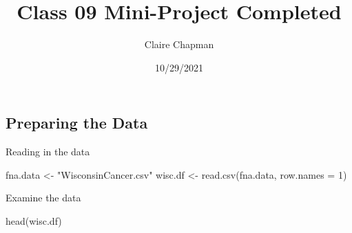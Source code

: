 \documentclass[
]{article}
\title{Class 09 Mini-Project Completed}
\author{Claire Chapman}
\date{10/29/2021}
\newenvironment{Shaded}{\begin{snugshade}}{\end{snugshade}}
\newcommand{\AttributeTok}[1]{\textcolor[rgb]{0.77,0.63,0.00}{#1}}
\newcommand{\DecValTok}[1]{\textcolor[rgb]{0.00,0.00,0.81}{#1}}
\newcommand{\FunctionTok}[1]{\textcolor[rgb]{0.00,0.00,0.00}{#1}}
\newcommand{\NormalTok}[1]{#1}
\newcommand{\OtherTok}[1]{\textcolor[rgb]{0.56,0.35,0.01}{#1}}
\newcommand{\StringTok}[1]{\textcolor[rgb]{0.31,0.60,0.02}{#1}}
\begin{document}
\maketitle

\hypertarget{preparing-the-data}{%
\subsection{Preparing the Data}\label{preparing-the-data}}

Reading in the data

\begin{Shaded}
\begin{Highlighting}[]
\NormalTok{fna.data }\OtherTok{\textless{}{-}} \StringTok{"WisconsinCancer.csv"}
\NormalTok{wisc.df }\OtherTok{\textless{}{-}} \FunctionTok{read.csv}\NormalTok{(fna.data, }\AttributeTok{row.names =} \DecValTok{1}\NormalTok{)}
\end{Highlighting}
\end{Shaded}

Examine the data

\begin{Shaded}
\begin{Highlighting}[]
\FunctionTok{head}\NormalTok{(wisc.df)}
\end{Highlighting}
\end{Shaded}
\end{document}
